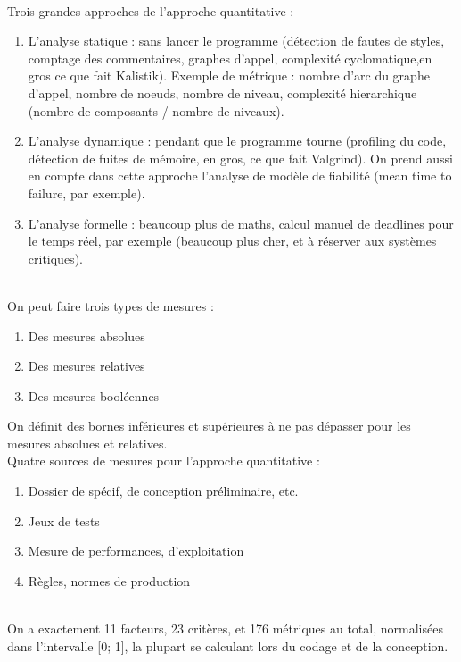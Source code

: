 \hfill\\

Trois grandes approches de l’approche quantitative :
\begin{enumerate}
\item L’analyse statique : sans lancer le programme (détection de fautes de styles, comptage des commentaires, graphes d’appel, complexité cyclomatique,en gros ce que fait Kalistik). Exemple de métrique : nombre d’arc du graphe d’appel, nombre de noeuds, nombre de niveau, complexité hierarchique (nombre de composants / nombre de niveaux).
\item L’analyse dynamique : pendant que le programme tourne (profiling du code, détection de fuites de mémoire, en gros, ce que fait Valgrind). On prend aussi en compte dans cette approche l’analyse de modèle de fiabilité (mean time to failure, par exemple).
\item L’analyse formelle : beaucoup plus de maths, calcul manuel de deadlines pour le temps réel, par exemple (beaucoup plus cher, et à réserver aux systèmes critiques).
\end{enumerate}

\hfill\\

On peut faire trois types de mesures :
\begin{enumerate}
\item Des mesures absolues
\item Des mesures relatives
\item Des mesures booléennes
\end{enumerate}

On définit des bornes inférieures et supérieures à ne pas dépasser pour les mesures absolues et relatives.\\

Quatre sources de mesures pour l’approche quantitative :
\begin{enumerate}
\item Dossier de spécif, de conception préliminaire, etc.
\item Jeux de tests
\item Mesure de performances, d’exploitation
\item Règles, normes de production
\end{enumerate}

\hfill\\

On a exactement 11 facteurs, 23 critères, et 176 métriques au total, normalisées dans l’intervalle [0; 1], la plupart se calculant lors du codage et de la conception.

